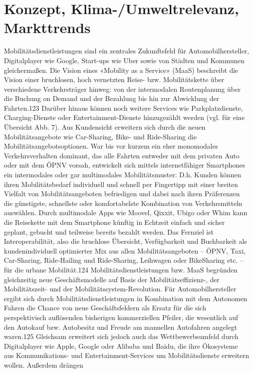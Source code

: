 \section{Konzept, Klima-/Umweltrelevanz, Markttrends}
Mobilitätsdienstleistungen sind ein zentrales Zukunftsfeld für Automobilhersteller,
Digitalplayer wie Google, Start-ups wie Uber sowie von Städten und Kommunen
gleichermaßen. Die Vision eines «Mobility as a Service» (MaaS) beschreibt die Vision
einer bruchlosen, hoch vernetzten Reise- bzw. Mobilitätskette über verschiedene
Verkehrsträger hinweg: von der intermodalen Routenplanung über die Buchung on
Demand und der Bezahlung bis hin zur Abwicklung der Fahrten.123 Darüber hinaus
können noch weitere Services wie Parkplatzdienste, Charging-Dienste oder Entertainment-Dienste hinzugezählt werden (vgl. für eine Übersicht Abb. 7).
Aus Kundensicht erweitern sich durch die neuen Mobilitätsangebote wie
Car-Sharing, Bike- und Ride-Sharing die Mobilitätsangebotsoptionen. War bis vor
kurzem ein eher monomodales Verkehrsverhalten dominant, das alle Fahrten entweder mit dem privaten Auto oder mit dem ÖPNV vorsah, entwickelt sich mittels
internetfähiger Smartphones ein intermodales oder gar multimodales Mobilitätsmuster: D.h. Kunden können ihren Mobilitätsbedarf individuell und schnell per
Fingertipp mit einer breiten Vielfalt von Mobilitätsangeboten befriedigen und dabei
nach ihren Präferenzen die günstigste, schnellste oder komfortabelste Kombination von Verkehrsmitteln auswählen. Durch multimodale Apps wie Moovel, Qixxit,
Ubigo oder Whim kann die Reisekette mit dem Smartphone künftig in Echtzeit
einfach und sicher geplant, gebucht und teilweise bereits bezahlt werden. Das
Fernziel ist Interoperabilität, also die bruchlose Übersicht, Verfügbarkeit und Buchbarkeit als kundenindividuell optimierter Mix aus allen Mobilitätsangeboten –
ÖPNV, Taxi, Car-Sharing, Ride-Hailing und Ride-Sharing, Leihwagen oder BikeSharing etc. – für die urbane Mobilität.124
Mobilitätsdienstleistungen bzw. MaaS begründen gleichzeitig neue Geschäftsmodelle auf Basis der Mobilitätseffizienz-, der Mobilitätszeit- und der Mobilitätssystem-Revolution. Für Automobilhersteller ergibt sich durch Mobilitätsdienstleistungen in Kombination mit dem Autonomen Fahren die Chance von neue
Geschäftsfeldern als Ersatz für die sich perspektivisch auflösenden bisherigen
kommerziellen Pfeiler, die wesentlich auf den Autokauf bzw. Autobesitz und
Freude am manuellen Autofahren angelegt waren.125 Gleichsam erweitert sich
jedoch auch das Wettbewerbsumfeld durch Digitalplayer wie Apple, Google
oder Alibaba und Baidu, die ihre Ökosysteme aus Kommunikations- und Entertainment-Services um Mobilitätsdienste erweitern wollen. Außerdem drängen
